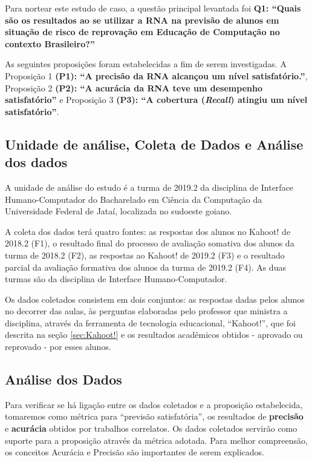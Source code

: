 \documentclass[
	12pt,				%
	openright,			%
	oneside,
	a4paper,			%
	english,			%
	french,				%
	spanish,			%
	brazil,				%
	]{abntex2}
\begin{document}
Para nortear este estudo de caso, a questão principal levantada foi \textbf{Q1: ``Quais são os resultados ao se utilizar a RNA na previsão de alunos em situação de risco de reprovação em Educação de Computação no contexto Brasileiro?''}

As seguintes proposições foram estabelecidas a fim de serem investigadas. A Proposição 1 \textbf{(P1): ``A precisão da RNA alcançou um nível satisfatório.''}, Proposição 2 \textbf{(P2): ``A acurácia da RNA teve um desempenho satisfatório''} e Proposição 3 \textbf{(P3): ``A cobertura (\textit{Recall}) atingiu um nível satisfatório''}.

\subsection{Unidade de análise, Coleta de Dados e Análise dos dados}
A unidade de análise do estudo é a turma de 2019.2 da disciplina de Interface Humano-Computador do Bacharelado em Ciência da Computação da Universidade Federal de Jataí, localizada no sudoeste goiano.

A coleta dos dados terá quatro fontes: as respostas dos alunos no Kahoot! de 2018.2 (F1), o resultado final do processo de avaliação somativa dos alunos da turma de 2018.2 (F2), as respostas ao Kahoot! de 2019.2 (F3) e o resultado parcial da avaliação formativa dos alunos da turma de 2019.2 (F4). As duas turmas são da disciplina de Interface Humano-Computador. 

Os dados coletados consistem em dois conjuntos: as respostas dadas pelos alunos no decorrer das aulas, às perguntas elaboradas pelo professor que ministra a disciplina, através da ferramenta de tecnologia educacional, ``Kahoot!'', que foi descrita na seção \ref{sec:Kahoot!} e os resultados acadêmicos obtidos - aprovado ou reprovado - por esses alunos.

\subsection{Análise dos Dados}
Para verificar se há ligação entre os dados coletados e a proposição estabelecida, tomaremos como métrica para ``previsão satisfatória'', os resultados de \textbf{precisão} e \textbf{acurácia} obtidos por trabalhos correlatos. Os dados coletados servirão como suporte para a proposição através da métrica adotada. Para melhor compreensão, os conceitos Acurácia e Precisão são importantes de serem explicados.
\end{document}

